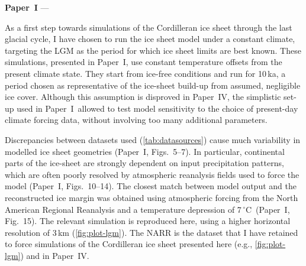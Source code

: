\documentclass{article}
\newcommand{\unit}[1]{\ensuremath{\mathrm{#1}}}
\newcommand{\degree}[0]{\ensuremath{^{\circ}}}
\newcommand{\degC}[0]{\unit{{\degree}C}}
\newcommand{\CCLI}[0]{Paper~I}      %
\newcommand{\CCYC}[0]{Paper~IV}     %
\begin{document}
\noindent\textbf{\CCLI} --- 
\bigskip

As a first step towards simulations of the Cordilleran ice sheet through the
last glacial cycle, I have chosen to run the ice sheet model under a constant
climate, targeting the LGM as the period for which ice sheet limits are best
known. These simulations, presented in \CCLI, use constant temperature offsets
from the present climate state. They start from ice-free conditions and run for
10\,ka, a period chosen as representative of the ice-sheet build-up from
assumed, negligible ice cover. Although this assumption is disproved in \CCYC,
the simplistic set-up used in \CCLI\ allowed to test model sensitivity to the
choice of present-day climate forcing data, without involving too many
additional parameters.

Discrepancies between datasets used (\cref{tab:datasources}) cause much
variability in modelled ice sheet geometries (\CCLI, Figs.~5--7). In
particular, continental parts of the ice-sheet are strongly dependent on input
precipitation patterns, which are often poorly resolved by atmospheric
reanalysis fields used to force the model (\CCLI, Figs.~10--14). The closest
match between model output and the reconstructed ice margin \citep{Dyke.2004}
was obtained using atmospheric forcing from the North American Regional
Reanalysis \citep[NARR,][]{Mesinger.etal.2006} and a temperature depression of
7\,\degC\ (\CCLI, Fig.~15). The relevant simulation is reproduced here, using a
higher horizontal resolution of 3\,km (\cref{fig:plot-lgm}). The NARR is the
dataset that I have retained to force simulations of the Cordilleran ice sheet
presented here (e.g., \cref{fig:plot-lgm}) and in \CCYC.
\end{document}

